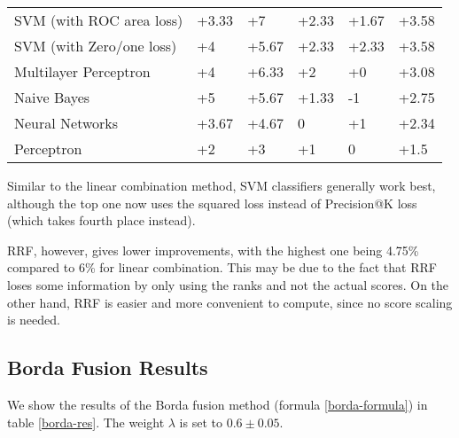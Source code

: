 \begin{table}[h!]
{\begin{tabular}{@{}llllll@{}}
SVM (with ROC area loss)                                                                    & +3.33                    & +7                          & +2.33                    & +1.67                       & +3.58             \\ 
SVM (with Zero/one loss)                                                                        & +4                       & +5.67                       & +2.33                    & +2.33                       & +3.58             \\ 
Multilayer Perceptron								& +4 & +6.33 & +2 & +0 & +3.08 \\
Naive Bayes                                                                      & +5                       & +5.67                       & +1.33                    & -1                         & +2.75             \\ 
Neural Networks                                                                   & +3.67                    & +4.67                       & 0                       & +1                          & +2.34             \\ 
Perceptron                                                              & +2                       & +3                          & +1                       & 0                          & +1.5              \\ \bottomrule
\end{tabular}%
}
\end{table}

Similar to the linear combination method, SVM classifiers generally work best,
although the top one now uses the squared loss instead of Precision@K loss (which takes fourth place instead).

RRF, however, gives lower improvements, with the highest one being 4.75\%
compared to 6\% for linear combination.
This may be due to the fact that RRF loses some information by only using the ranks and not the actual scores. On the other hand, RRF
is easier and more convenient to compute, since no score scaling is needed.


\subsection{Borda Fusion Results}
We show the results of the Borda fusion method (formula \ref{borda-formula}) in table \ref{borda-res}.
The weight $\lambda$ is set to $0.6\pm 0.05$.

